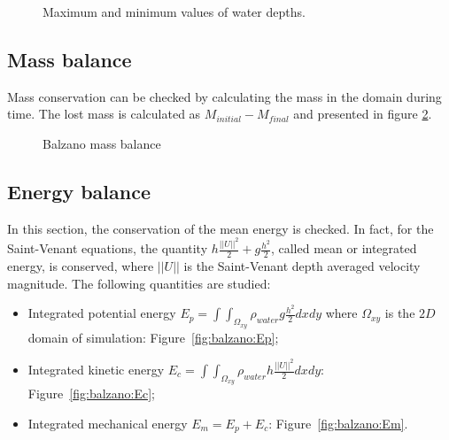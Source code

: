 \begin{figure}[H]
\centering
{}
\caption{Maximum and minimum values of water depths.}
\label{t2d:balzano:minmax}
\end{figure}

\subsection{Mass balance}

Mass conservation can be checked by calculating the mass in the domain during time. The lost mass is calculated as 
$M_{initial} - M_{final}$ and presented in figure \ref{fig:balzano:massbalance}. 

\begin{figure}[h!]
  \centering
  \caption{Balzano mass balance}\label{fig:balzano:massbalance}
\end{figure}

\subsection{Energy balance}

In this section, the conservation of the mean energy is checked. In fact, for the Saint-Venant equations,
the quantity $h \frac{||U||^2}{2} + g \frac{h^2}{2}$, called mean or integrated energy, is conserved,
where $||U||$ is the Saint-Venant depth averaged velocity magnitude.
The following quantities are studied:
\begin{itemize}
\item Integrated potential energy \textbf{$E_p =\int\int_{\Omega_{xy}}\rho_{water} g \frac{h^2}{2} dxdy$} where $\Omega_{xy}$ is the $2D$ domain of simulation: Figure~\ref{fig:balzano:Ep};
\item Integrated kinetic energy \textbf{$E_c =\int\int_{\Omega_{xy}} \rho_{water} h \frac{||U||^2}{2} dxdy$}: Figure~\ref{fig:balzano:Ec};
\item Integrated mechanical energy \textbf{$E_m = E_p + E_c$}: Figure~\ref{fig:balzano:Em}.
\end{itemize}

